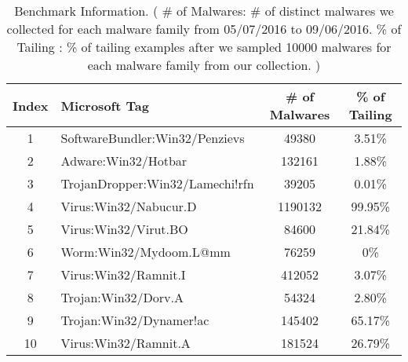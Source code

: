 \begin{table}
  \centering
  \scriptsize
  \begin{tabular}{clcc}
    \toprule
{\bf Index} & {\bf Microsoft Tag} & {\bf \# of Malwares} & {\bf \% of Tailing} \\
\midrule                                                                                                                                                                                                                                           
1  &  SoftwareBundler:Win32/Penzievs 	& 49380	   & 3.51\%  \\
2  &  Adware:Win32/Hotbar               & 132161   & 1.88\%  \\
3  &  TrojanDropper:Win32/Lamechi!rfn	& 39205	   & 0.01\%  \\
4  &  Virus:Win32/Nabucur.D	            & 1190132  & 99.95\% \\
5  &  Virus:Win32/Virut.BO	            & 84600	   & 21.84\% \\
6  &  Worm:Win32/Mydoom.L@mm	        & 76259	   & 0\%     \\
7  &  Virus:Win32/Ramnit.I              & 412052   & 3.07\%  \\
8  &  Trojan:Win32/Dorv.A               & 54324    & 2.80\%  \\
9  &  Trojan:Win32/Dynamer!ac           & 145402   & 65.17\% \\
10 &  Virus:Win32/Ramnit.A              & 181524   & 26.79\% \\   

\bottomrule
   \end{tabular}
  \caption{ Benchmark Information.
  \footnotesize{
  ( \# of Malwares: \# of distinct malwares we collected for each malware family from 05/07/2016 to 09/06/2016. 
    \% of Tailing : \% of tailing examples after we sampled 10000 malwares for each malware family from our collection.  
  ) 
}
 }
  \label{tab:benchmarks}
\end{table}